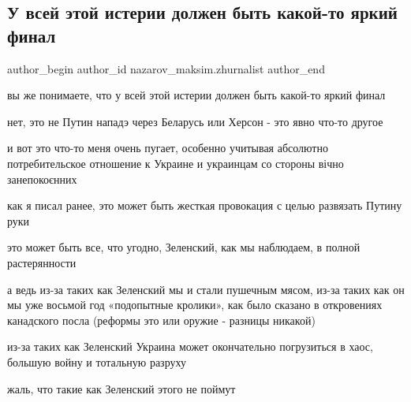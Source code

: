  
 
 
 
 
 
\subsection{У всей этой истерии должен быть какой-то яркий финал}
\label{sec:12_02_2022.fb.nazarov_maksim.zhurnalist.1.isteria_final}
 
\ifcmt
 author_begin
   author_id nazarov_maksim.zhurnalist
 author_end
\fi

вы же понимаете, что у всей этой истерии должен быть какой-то яркий финал

нет, это не Путин нападэ через Беларусь или Херсон - это явно что-то другое 

и вот это что-то меня очень пугает, особенно учитывая абсолютно потребительское
отношение к Украине и украинцам со стороны вічно занепокоєнних

как я писал ранее, это может быть жесткая провокация с целью развязать Путину
руки

это может быть все, что угодно, Зеленский, как мы наблюдаем, в полной
растерянности 

а ведь из-за таких как Зеленский мы и стали пушечным мясом, из-за таких как он
мы уже восьмой год «подопытные кролики», как было сказано в откровениях
канадского посла (реформы это или оружие - разницы никакой)

из-за таких как Зеленский Украина может окончательно погрузиться в хаос,
большую войну и тотальную разруху 

жаль, что такие как Зеленский этого не поймут

